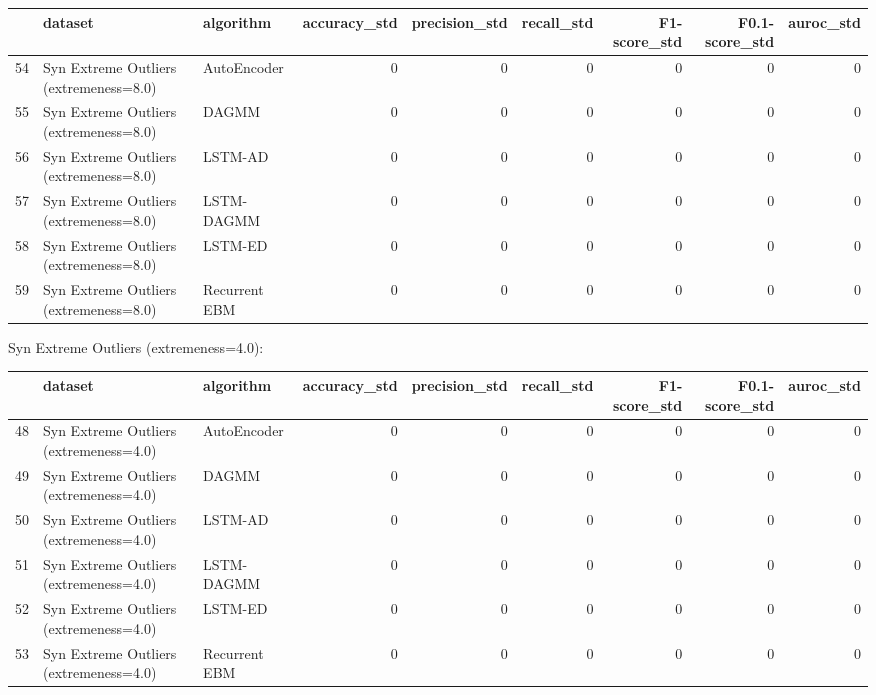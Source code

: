 \begin{tabular}{rllrrrrrr}
\hline
    & dataset                                & algorithm     &   accuracy\_std &   precision\_std &   recall\_std &   F1-score\_std &   F0.1-score\_std &   auroc\_std \\
\hline
 54 & Syn Extreme Outliers (extremeness=8.0) & AutoEncoder   &              0 &               0 &            0 &              0 &                0 &           0 \\
 55 & Syn Extreme Outliers (extremeness=8.0) & DAGMM         &              0 &               0 &            0 &              0 &                0 &           0 \\
 56 & Syn Extreme Outliers (extremeness=8.0) & LSTM-AD       &              0 &               0 &            0 &              0 &                0 &           0 \\
 57 & Syn Extreme Outliers (extremeness=8.0) & LSTM-DAGMM    &              0 &               0 &            0 &              0 &                0 &           0 \\
 58 & Syn Extreme Outliers (extremeness=8.0) & LSTM-ED       &              0 &               0 &            0 &              0 &                0 &           0 \\
 59 & Syn Extreme Outliers (extremeness=8.0) & Recurrent EBM &              0 &               0 &            0 &              0 &                0 &           0 \\
\hline
\end{tabular}

Syn Extreme Outliers (extremeness=4.0):

\begin{tabular}{rllrrrrrr}
\hline
    & dataset                                & algorithm     &   accuracy\_std &   precision\_std &   recall\_std &   F1-score\_std &   F0.1-score\_std &   auroc\_std \\
\hline
 48 & Syn Extreme Outliers (extremeness=4.0) & AutoEncoder   &              0 &               0 &            0 &              0 &                0 &           0 \\
 49 & Syn Extreme Outliers (extremeness=4.0) & DAGMM         &              0 &               0 &            0 &              0 &                0 &           0 \\
 50 & Syn Extreme Outliers (extremeness=4.0) & LSTM-AD       &              0 &               0 &            0 &              0 &                0 &           0 \\
 51 & Syn Extreme Outliers (extremeness=4.0) & LSTM-DAGMM    &              0 &               0 &            0 &              0 &                0 &           0 \\
 52 & Syn Extreme Outliers (extremeness=4.0) & LSTM-ED       &              0 &               0 &            0 &              0 &                0 &           0 \\
 53 & Syn Extreme Outliers (extremeness=4.0) & Recurrent EBM &              0 &               0 &            0 &              0 &                0 &           0 \\
\hline
\end{tabular}

